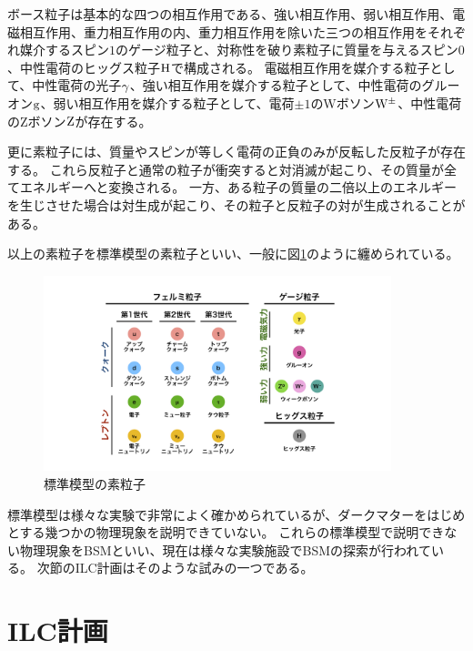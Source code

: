 ボース粒子は基本的な四つの相互作用である、強い相互作用、弱い相互作用、電磁相互作用、重力相互作用の内、重力相互作用を除いた三つの相互作用をそれぞれ媒介するスピン$1$のゲージ粒子と、対称性を破り素粒子に質量を与えるスピン$0$、中性電荷のヒッグス粒子$\rm H$で構成される。
電磁相互作用を媒介する粒子として、中性電荷の光子$\rm \gamma$、強い相互作用を媒介する粒子として、中性電荷のグルーオン$\rm g$、弱い相互作用を媒介する粒子として、電荷$\pm 1$のWボソン$\rm W^{\pm}$、中性電荷のZボソン$\rm Z$が存在する。

更に素粒子には、質量やスピンが等しく電荷の正負のみが反転した反粒子が存在する。
これら反粒子と通常の粒子が衝突すると対消滅が起こり、その質量が全てエネルギーへと変換される。
一方、ある粒子の質量の二倍以上のエネルギーを生じさせた場合は対生成が起こり、その粒子と反粒子の対が生成されることがある。

以上の素粒子を標準模型の素粒子といい、一般に図\ref{1SMParticle}のように纏められている。

\begin{figure}[htbp]
 \centering
 \includegraphics[width=0.9\textwidth]{Figure/1Introduction/1SMParticle.png}
 \caption{標準模型の素粒子}
 \label{1SMParticle}
\end{figure}

標準模型は様々な実験で非常によく確かめられているが、ダークマターをはじめとする幾つかの物理現象を説明できていない。
これらの標準模型で説明できない物理現象をBSMといい、現在は様々な実験施設でBSMの探索が行われている。
次節のILC計画はそのような試みの一つである。


\section{ILC計画} \label{Intro:InternationalLinearColliderProject}

